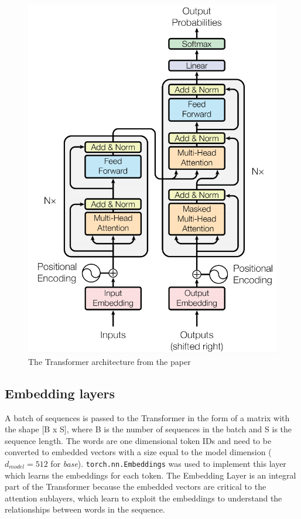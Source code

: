 \documentclass[12pt,a4paper,twoside,openright]{report}
\begin{document}
\begin{figure}
    \centering
    \includegraphics[width=\textwidth/2]{figs/transformer-architecture.PNG}
    \caption{The Transformer architecture from the paper \cite{transformers}}
    \label{fig:transformer-architecture}
\end{figure}

\subsection{Embedding layers}
\label{embedding-layers}

A batch of sequences is passed to the Transformer in the form of a matrix with the shape [B x S], where B is the number of sequences in the batch and S is the sequence length. The words are one dimensional token IDs and need to be converted to embedded vectors with a size equal to the model dimension ($d_{model} = 512$ for \textit{base}). \lstinline{torch.nn.Embeddings} was used to implement this layer which learns the embeddings for each token. The Embedding Layer is an integral part of the Transformer because the embedded vectors are critical to the attention sublayers, which learn to exploit the embeddings to understand the relationships between words in the sequence.
\end{document}
